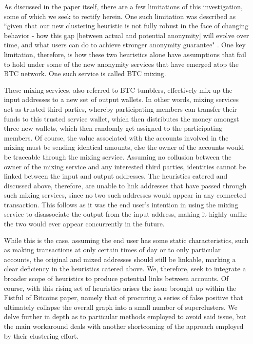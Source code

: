 \documentclass[journal]{IEEEtran}
\begin{document}
As discussed in the paper itself, there are a few limitations of this investigation, some of which we seek to rectify herein. One such limitation was described as ``given that our new clustering heuristic is not fully robust in the face of changing behavior - how this gap [between actual and potential anonymity] will evolve over time, and what users can do to achieve stronger anonymity guarantee" \cite{fistful}. One key limitation, therefore, is how these two heuristics alone have assumptions that fail to hold under some of the new anonymity services that have emerged atop the BTC network. One such service is called BTC mixing.

These mixing services, also referred to BTC tumblers, effectively mix up the input addresses to a new set of output wallets. In other words, mixing services act as trusted third parties, whereby participating members can transfer their funds to this trusted service wallet, which then distributes the money amongst three new wallets, which then randomly get assigned to the participating members. Of course, the value associated with the accounts involved in the mixing must be sending identical amounts, else the owner of the accounts would be traceable through the mixing service. Assuming no collusion between the owner of the mixing service and any interested third parties, identities cannot be linked between the input and output addresses. The heuristics catered and discussed above, therefore, are unable to link addresses that have passed through such mixing services, since no two such addresses would appear in any connected transaction. This follows as it was the end user's intention in using the mixing service to disassociate the output from the input address, making it highly unlike the two would ever appear concurrently in the future.

While this is the case, assuming the end user has some static characteristics, such as making transactions at only certain times of day or to only particular accounts, the original and mixed addresses should still be linkable, marking a clear deficiency in the heuristics catered above. We, therefore, seek to integrate a broader scope of heuristics to produce potential links between accounts. Of course, with this rising set of heuristics arises the issue brought up within the Fistful of Bitcoins paper, namely that of procuring a series of false positive that ultimately collapse the overall graph into a small number of superclusters. We delve further in depth as to particular methods employed to avoid said issue, but the main workaround deals with another shortcoming of the approach employed by their clustering effort.
\end{document}
